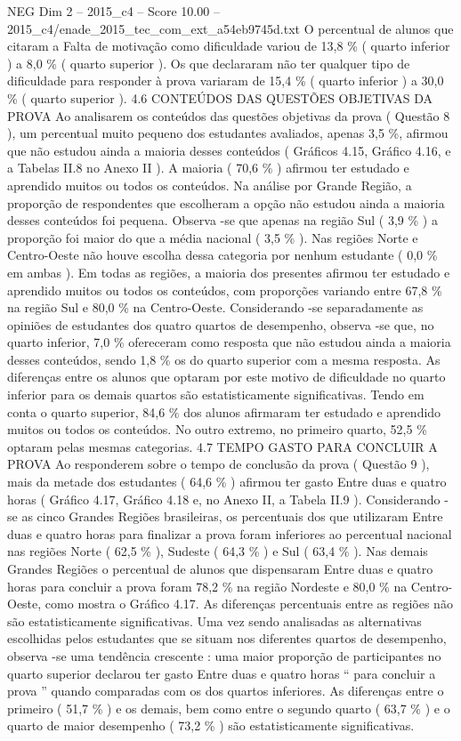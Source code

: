 \begin{textsample}{NEG Dim 2 – 2015\_c4 – Score 10.00 – 2015\_c4/enade\_2015\_tec\_com\_ext\_a54eb9745d.txt}
O percentual de alunos que citaram a Falta de motivação como dificuldade variou de 13,8 \% ( quarto inferior ) a 8,0 \% ( quarto superior ).
Os que declararam não ter qualquer tipo de dificuldade para responder à prova variaram de 15,4 \% ( quarto inferior ) a 30,0 \% ( quarto superior ). 4.6 CONTEÚDOS DAS QUESTÕES OBJETIVAS DA PROVA Ao analisarem os conteúdos das questões objetivas da prova ( Questão 8 ), um percentual muito pequeno dos estudantes avaliados, apenas 3,5 \%, afirmou que não estudou ainda a maioria desses conteúdos ( Gráficos 4.15, Gráfico 4.16, e a Tabelas II.8 no Anexo II ).
A maioria ( 70,6 \% ) afirmou ter estudado e aprendido muitos ou todos os conteúdos.
Na análise por Grande Região, a proporção de respondentes que escolheram a opção não estudou ainda a maioria desses conteúdos foi pequena.
Observa -se que apenas na região Sul ( 3,9 \% ) a proporção foi maior do que a média nacional ( 3,5 \% ).
Nas regiões Norte e Centro-Oeste não houve escolha dessa categoria por nenhum estudante ( 0,0 \% em ambas ).
Em todas as regiões, a maioria dos presentes afirmou ter estudado e aprendido muitos ou todos os conteúdos, com proporções variando entre 67,8 \% na região Sul e 80,0 \% na Centro-Oeste.
Considerando -se separadamente as opiniões de estudantes dos quatro quartos de desempenho, observa -se que, no quarto inferior, 7,0 \% ofereceram como resposta que não estudou ainda a maioria desses conteúdos, sendo 1,8 \% os do quarto superior com a mesma resposta.
As diferenças entre os alunos que optaram por este motivo de dificuldade no quarto inferior para os demais quartos são estatisticamente significativas.
Tendo em conta o quarto superior, 84,6 \% dos alunos afirmaram ter estudado e aprendido muitos ou todos os conteúdos.
No outro extremo, no primeiro quarto, 52,5 \% optaram pelas mesmas categorias. 4.7 TEMPO GASTO PARA CONCLUIR A PROVA Ao responderem sobre o tempo de conclusão da prova ( Questão 9 ), mais da metade dos estudantes ( 64,6 \% ) afirmou ter gasto Entre duas e quatro horas ( Gráfico 4.17, Gráfico 4.18 e, no Anexo II, a Tabela II.9 ).
Considerando -se as cinco Grandes Regiões brasileiras, os percentuais dos que utilizaram Entre duas e quatro horas para finalizar a prova foram inferiores ao percentual nacional nas regiões Norte ( 62,5 \% ), Sudeste ( 64,3 \% ) e Sul ( 63,4 \% ).
Nas demais Grandes Regiões o percentual de alunos que dispensaram Entre duas e quatro horas para concluir a prova foram 78,2 \% na região Nordeste e 80,0 \% na Centro-Oeste, como mostra o Gráfico 4.17.
As diferenças percentuais entre as regiões não são estatisticamente significativas.
Uma vez sendo analisadas as alternativas escolhidas pelos estudantes que se situam nos diferentes quartos de desempenho, observa -se uma tendência crescente : uma maior proporção de participantes no quarto superior declarou ter gasto Entre duas e quatro horas “ para concluir a prova ” quando comparadas com os dos quartos inferiores.
As diferenças entre o primeiro ( 51,7 \% ) e os demais, bem como entre o segundo quarto ( 63,7 \% ) e o quarto de maior desempenho ( 73,2 \% ) são estatisticamente significativas.

\end{textsample}
